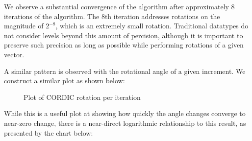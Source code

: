 \documentclass[../report_polarFIR.tex]{subfiles}
\begin{document}
We observe a substantial convergence of the algorithm after approximately 8 iterations of the algorithm. The 8th iteration addresses rotations on the magnitude of $2^{-8}$, which is an extremely small rotation. Traditional  datatypes do not consider levels beyond this amount of percision, although it is important to preserve such precision as long as possible while performing rotations of a given vector. 

A similar pattern is observed with the rotational angle of a given increment. We construct a similar plot as shown below:


\begin{figure}[h!]
\begin{center}

   
   \caption{Plot of CORDIC rotation per iteration}
   
\end{center}

\end{figure}
\FloatBarrier


While this is a useful plot at showing how quickly the angle changes converge to near-zero change, there is a near-direct logarithmic relationship to this result, as presented by the chart below:
\end{document}
